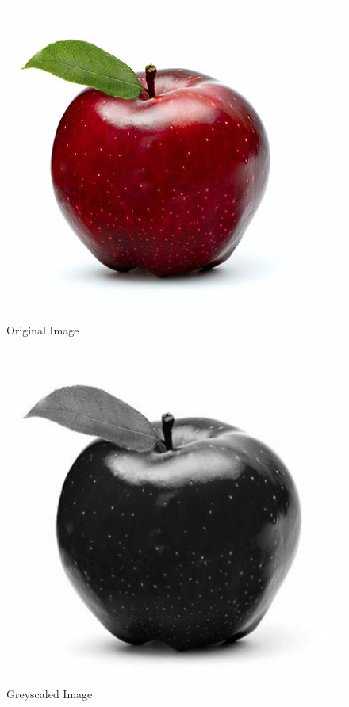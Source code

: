 \documentclass[titlepage]{article}
\begin{document}
\begin{figure}[H]
  \includegraphics[width=\linewidth]{Lion.jpeg}
  \caption{Original Image}\label{fig:lio}
\endminipage\hfill
{}
  \includegraphics[width=\linewidth]{Grey_Lion.png}
  \caption{Greyscaled Image}\label{fig:glio}
\endminipage\hfill
\end{figure}
\end{document}
